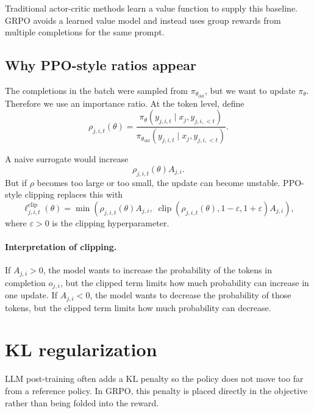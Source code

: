 \documentclass[11pt]{article}
\newcommand{\clip}{\operatorname{clip}}
\newcommand{\old}{\mathrm{old}}
\begin{document}
Traditional actor-critic methods learn a value function to supply this baseline. GRPO avoids a learned value model and instead uses group rewards from multiple completions for the same prompt.

\subsection{Why PPO-style ratios appear}

The completions in the batch were sampled from $\pi_{\theta_{\old}}$, but we want to update $\pi_\theta$. Therefore we use an importance ratio. At the token level, define
\begin{equation}
\rho_{j,i,t}(\theta)
=\frac{\pi_\theta(y_{j,i,t}\mid x_j,y_{j,i,<t})}
{\pi_{\theta_{\old}}(y_{j,i,t}\mid x_j,y_{j,i,<t})}.
\label{eq:rho}
\end{equation}

A naive surrogate would increase
\begin{equation}
\rho_{j,i,t}(\theta)A_{j,i}.
\end{equation}
But if $\rho$ becomes too large or too small, the update can become unstable. PPO-style clipping replaces this with
\begin{equation}
\ell^{\mathrm{clip}}_{j,i,t}(\theta)
=\min\left(
\rho_{j,i,t}(\theta)A_{j,i},\;
\clip(\rho_{j,i,t}(\theta),1-\varepsilon,1+\varepsilon)A_{j,i}
\right),
\label{eq:clip_loss}
\end{equation}
where $\varepsilon>0$ is the clipping hyperparameter.

\paragraph{Interpretation of clipping.}
If $A_{j,i}>0$, the model wants to increase the probability of the tokens in completion $o_{j,i}$, but the clipped term limits how much probability can increase in one update. If $A_{j,i}<0$, the model wants to decrease the probability of those tokens, but the clipped term limits how much probability can decrease.

\section{KL regularization}

LLM post-training often adds a KL penalty so the policy does not move too far from a reference policy. In GRPO, this penalty is placed directly in the objective rather than being folded into the reward.
\end{document}
